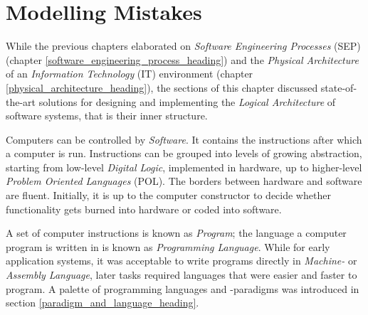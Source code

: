 %
%
%
%
%
%
%

\section{Modelling Mistakes}
\label{modelling_mistakes_heading}

While the previous chapters elaborated on \emph{Software Engineering Processes}
(SEP) (chapter \ref{software_engineering_process_heading}) and the
\emph{Physical Architecture} of an \emph{Information Technology} (IT)
environment (chapter \ref{physical_architecture_heading}), the sections of this
chapter discussed state-of-the-art solutions for designing and implementing the
\emph{Logical Architecture} of software systems, that is their inner structure.

Computers can be controlled by \emph{Software}. It contains the instructions
after which a computer is run. Instructions can be grouped into levels of
growing abstraction, starting from low-level \emph{Digital Logic}, implemented
in hardware, up to higher-level \emph{Problem Oriented Languages} (POL). The
borders between hardware and software are fluent. Initially, it is up to the
computer constructor to decide whether functionality gets burned into hardware
or coded into software.

A set of computer instructions is known as \emph{Program}; the language a
computer program is written in is known as \emph{Programming Language}. While
for early application systems, it was acceptable to write programs directly in
\emph{Machine-} or \emph{Assembly Language}, later tasks required languages
that were easier and faster to program. A palette of programming languages and
-paradigms was introduced in section \ref{paradigm_and_language_heading}.

